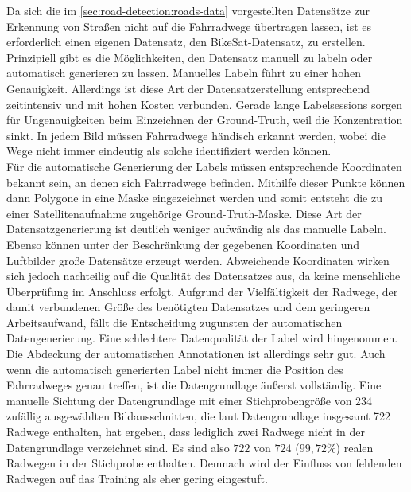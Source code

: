 Da sich die im \autoref{sec:road-detection:roads-data} vorgestellten Datensätze zur Erkennung von Straßen nicht auf die Fahrradwege übertragen lassen, 
ist es erforderlich einen eigenen Datensatz, den BikeSat-Datensatz, zu erstellen.
Prinzipiell gibt es die Möglichkeiten, den Datensatz manuell zu labeln oder automatisch generieren zu lassen.
Manuelles Labeln führt zu einer hohen Genauigkeit.
Allerdings ist diese Art der Datensatzerstellung entsprechend zeitintensiv und mit hohen Kosten verbunden.
Gerade lange Labelsessions sorgen für Ungenauigkeiten beim Einzeichnen der Ground-Truth, weil die Konzentration sinkt. 
In jedem Bild müssen Fahrradwege händisch erkannt werden, wobei die Wege nicht immer eindeutig als solche identifiziert werden können.\\
Für die automatische Generierung der Labels müssen entsprechende Koordinaten bekannt sein, an denen sich Fahrradwege befinden.
Mithilfe dieser Punkte können dann Polygone in eine Maske eingezeichnet werden 
und somit entsteht die zu einer Satellitenaufnahme zugehörige Ground-Truth-Maske.
Diese Art der Datensatzgenerierung ist deutlich weniger aufwändig als das manuelle Labeln. 
Ebenso können unter der Beschränkung der gegebenen Koordinaten und Luftbilder große Datensätze erzeugt werden.
Abweichende Koordinaten wirken sich jedoch nachteilig auf die Qualität des Datensatzes aus, da keine menschliche Überprüfung im Anschluss erfolgt.
Aufgrund der Vielfältigkeit der Radwege, der damit verbundenen Größe des benötigten Datensatzes und dem geringeren Arbeitsaufwand, 
fällt die Entscheidung zugunsten der automatischen Datengenerierung.
Eine schlechtere Datenqualität der Label wird hingenommen. \\
Die Abdeckung der automatischen Annotationen ist allerdings sehr gut. Auch wenn die 
automatisch generierten Label nicht immer die Position des Fahrradweges genau treffen, 
ist die Datengrundlage äußerst vollständig. Eine manuelle Sichtung der Datengrundlage mit 
einer Stichprobengröße von 234 zufällig 
ausgewählten Bildausschnitten, die laut Datengrundlage insgesamt 722 Radwege enthalten, hat ergeben, 
dass lediglich zwei Radwege nicht in der Datengrundlage verzeichnet sind. Es sind also $722$ 
von $724$ ($99,72\%$) realen Radwegen in der Stichprobe enthalten. Demnach wird der Einfluss von 
fehlenden Radwegen auf das Training als eher gering eingestuft.   
 

